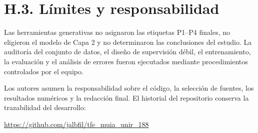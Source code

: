 \section*{H.3. Límites y responsabilidad}

Las herramientas generativas no asignaron las etiquetas P1--P4 finales, no eligieron el
modelo de Capa 2 y no determinaron las conclusiones del estudio. La auditoría del
conjunto de datos, el diseño de supervisión débil, el entrenamiento, la evaluación y el
análisis de errores fueron ejecutados mediante procedimientos controlados por el equipo.

Los autores asumen la responsabilidad sobre el código, la selección de fuentes, los
resultados numéricos y la redacción final. El historial del repositorio conserva la
trazabilidad del desarrollo:

\begin{center}
\url{https://github.com/jalbfil/tfe_muia_unir_188}
\end{center}
